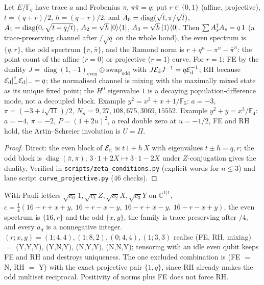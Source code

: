 \begin{proposition}
\label{prop:four-letter-elliptic}
Let $E/\mathbb F_q$ have trace $a$ and Frobenius $\pi$, $\pi\bar\pi = q$; put $r\in\{0,1\}$ (affine,
projective), $t = (q+r)/2$, $h = (q-r)/2$, and
$A_{0} = \operatorname{diag}(\sqrt t,\pi/\sqrt t)$, $A_{1} = \operatorname{diag}(0,\sqrt{t-q/t})$,
$A_{2} = \sqrt h\,|0\rangle\langle1|$, $A_{3} = \sqrt h\,|1\rangle\langle0|$. Then
$\sum A_{s}^\dagger A_{s} = q\,1$ (a trace-preserving channel after $/\sqrt q$ on the whole bond),
the even spectrum is $\{q,r\}$, the odd spectrum $\{\pi,\bar\pi\}$, and the Ramond norm is
$r+q^n-\pi^n-\bar\pi^n$: the point count of the affine ($r = 0$) or projective ($r = 1$) curve.
For $r = 1$: FE by the duality $J = \operatorname{diag}(1,-1)_{\text{even}}\oplus\text{swap}_{\text{odd}}$
with $J\mathcal E_{\mathrm d} J^{-1} = q\mathcal E_{\mathrm d}^{-1}$; RH because $\mathcal E_{\mathrm d}|_-^\dagger\mathcal E_{\mathrm d}|_- = q$; the normalised channel is
mixing with the maximally mixed state as its unique fixed point; the $H^0$ eigenvalue $1$ is a
decaying population-difference mode, not a decoupled block. Example $y^2 = x^3+x+1/\mathbb F_5$:
$a = -3$, $\pi = (-3+i\sqrt{11})/2$, $N_n = 9,27,108,675,3069,15552$. Example $y^2+y = x^3/\mathbb F_4$:
$a = -4$, $\pi = -2$, $P = (1+2u)^2$, a real double zero at $u = -1/2$, FE and RH hold, the
Artin--Schreier involution is $U = \Pi$.
\end{proposition}

\begin{proof}
Direct: the even block of $\mathcal E_{\mathrm d}$ is $t\,1+h\,X$ with eigenvalues $t\pm h = q, r$; the odd block is
$\operatorname{diag}(\bar\pi,\pi)$; $3\cdot1+2X\mapsto3\cdot1-2X$ under $Z$-conjugation gives the duality.
Verified in \texttt{scripts/zeta\_conditions.py} (explicit words for $n\le3$) and lane script
\texttt{curve\_projective.py} ($46$ checks).
\end{proof}

\begin{proposition}
\label{prop:fe-rh-mixing-independent}
With Pauli letters $\sqrt{c_0}\,1,\sqrt{c_1}Z,\sqrt{c_2}X,\sqrt{c_3}Y$ on $\mathbb C^{1|1}$,
$c = \tfrac14(16+r+x+y,\ 16+r-x-y,\ 16-r+x-y,\ 16-r-x+y)$, the even spectrum is $\{16,r\}$ and the
odd $\{x,y\}$, the family is trace preserving after $/4$, and every $a_d$ is a nonnegative integer.
$(r;x,y) = (1;4,4), (1;8,2), (0;4,4), (1;3,3)$ realise (FE, RH, mixing) $=$ (Y,Y,Y), (Y,N,Y), (N,Y,Y),
(N,N,Y); tensoring with an idle even qubit keeps FE and RH and destroys uniqueness. The one
excluded combination is (FE $=$ N, RH $=$ Y) with the exact projective pair $\{1,q\}$, since RH
already makes the odd multiset reciprocal. Positivity of norms plus FE does not force RH.
\end{proposition}

